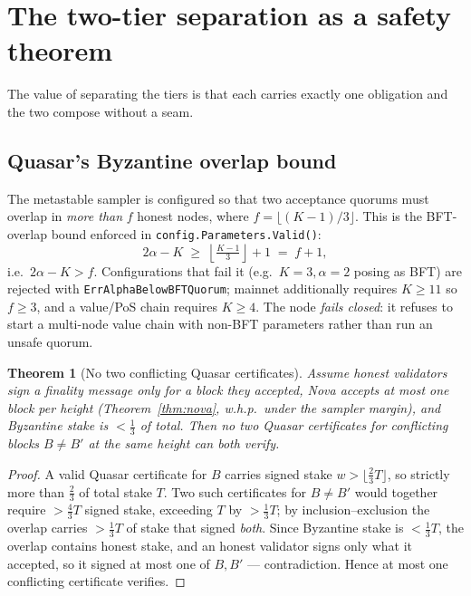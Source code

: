 \documentclass[11pt,a4paper]{article}
\newtheorem{theorem}{Theorem}[section]
\begin{document}
\section{The two-tier separation as a safety theorem}
\label{sec:safety}

The value of separating the tiers is that each carries exactly one obligation and the two
compose without a seam.

\subsection{Quasar's Byzantine overlap bound}

The metastable sampler is configured so that two acceptance quorums must overlap in
\emph{more than} \(f\) honest nodes, where \(f=\lfloor (K-1)/3\rfloor\). This is the
BFT-overlap bound enforced in \texttt{config.Parameters.Valid()}:
\[
2\alpha - K \;\ge\; \left\lfloor \tfrac{K-1}{3} \right\rfloor + 1 \;=\; f+1 ,
\]
i.e.\ \(2\alpha - K > f\). Configurations that fail it (e.g.\ \(K{=}3,\alpha{=}2\) posing as
BFT) are rejected with \texttt{ErrAlphaBelowBFTQuorum}; mainnet additionally requires
\(K\ge 11\) so \(f\ge 3\), and a value/PoS chain requires \(K\ge 4\). The node
\emph{fails closed}: it refuses to start a multi-node value chain with non-BFT parameters
rather than run an unsafe quorum.

\begin{theorem}[No two conflicting Quasar certificates]
\label{thm:quasar}
Assume honest validators sign a finality message only for a block they accepted, Nova accepts
at most one block per height (Theorem~\ref{thm:nova}, w.h.p.\ under the sampler margin), and
Byzantine stake is \(< \tfrac{1}{3}\) of total. Then no two Quasar certificates for
conflicting blocks \(B\ne B'\) at the same height can both verify.
\end{theorem}
\begin{proof}
A valid Quasar certificate for \(B\) carries signed stake \(w>\lfloor\tfrac{2}{3}T\rfloor\),
so strictly more than \(\tfrac{2}{3}\) of total stake \(T\). Two such certificates for
\(B\ne B'\) would together require \(> \tfrac{4}{3}T\) signed stake, exceeding \(T\) by
\(>\tfrac{1}{3}T\); by inclusion--exclusion the overlap carries \(>\tfrac{1}{3}T\) of stake
that signed \emph{both}. Since Byzantine stake is \(<\tfrac{1}{3}T\), the overlap contains
honest stake, and an honest validator signs only what it accepted, so it signed at most one
of \(B,B'\) --- contradiction. Hence at most one conflicting certificate verifies.
\end{proof}
\end{document}
